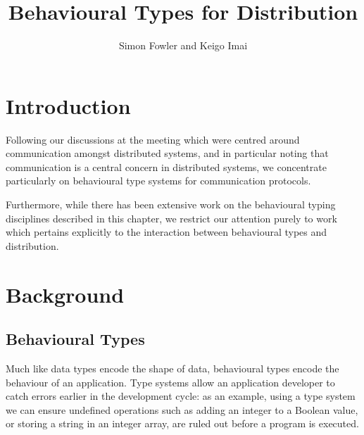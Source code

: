 \documentclass[
graybox,
envcountchap
]{svmult}
\begin{document}
\begin{bibunit}

	\title*{Behavioural Types for Distribution}
	\author{Simon Fowler and Keigo Imai}

	\maketitle


  \section{Introduction}



  Following our discussions at the meeting which were centred around
  communication amongst distributed systems, and in particular noting that
  communication is a central concern in distributed systems, we concentrate
  particularly on behavioural type systems for communication protocols.

  Furthermore, while there has been extensive work on the behavioural typing
  disciplines described in this chapter, we restrict our attention purely to
  work which pertains explicitly to the interaction between behavioural types
  and distribution.

  \section{Background}
  \subsection{Behavioural Types}

  Much like data types encode the shape of data, behavioural types encode the
  behaviour of an application. Type systems allow an application developer to
  catch errors earlier in the development cycle: as an example, using a type
  system we can ensure undefined operations such as adding an integer to a
  Boolean value, or storing a string in an integer array, are ruled out before a
  program is executed.


\end{bibunit}
\end{document}
